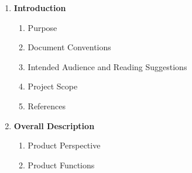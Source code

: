 \documentclass[12pt]{article}
\renewcommand{\_}{\kern-1.5pt\textunderscore\kern-1.5pt}
\begin{document}
\newpage

\par

\begin{enumerate}
	\item {\fontsize{13pt}{15.6pt}\selectfont \textbf{Introduction}\par}\par

\begin{enumerate}
	\item {\fontsize{13pt}{15.6pt}\selectfont Purpose\par}\par

	\item {\fontsize{13pt}{15.6pt}\selectfont Document Conventions\par}\par

	\item {\fontsize{13pt}{15.6pt}\selectfont Intended Audience and Reading Suggestions\par}\par

	\item {\fontsize{13pt}{15.6pt}\selectfont Project Scope\par}\par

	\item {\fontsize{13pt}{15.6pt}\selectfont References\par}\par


\end{enumerate}
	\item {\fontsize{13pt}{15.6pt}\selectfont \textbf{Overall Description}\par}\par

\begin{enumerate}
	\item {\fontsize{13pt}{15.6pt}\selectfont Product Perspective\par}\par

	\item {\fontsize{13pt}{15.6pt}\selectfont Product Functions\par}\par


\end{enumerate}
\end{enumerate}
\end{document}
